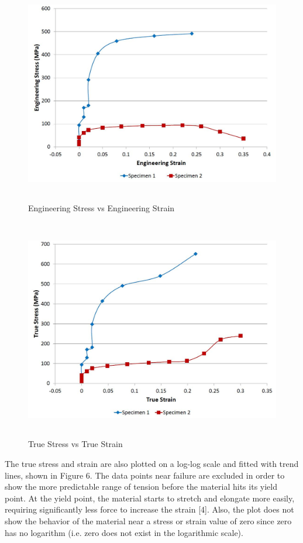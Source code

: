 \documentclass[12pt]{article}
\begin{document}
\newpage

\begin{figure}[h!]  
  \centering
    \includegraphics[width=5.5in,height=3.8in]{engr_stress_vs_engr_strain.JPG}
    \caption{Engineering Stress vs Engineering Strain}
\end{figure}

\begin{figure}[h!]  
  \centering
    \includegraphics[width=5.5in,height=3.8in]{true_stress_vs_true_strain.JPG}
    \caption{True Stress vs True Strain}
\end{figure}

\newpage

The true stress and strain are also plotted on a log-log scale and fitted with trend lines, shown in Figure 6. The data points near failure are excluded in order to show the more predictable range of tension before the material hits its yield point. At the yield point, the material starts to stretch and elongate more easily, requiring significantly less force to increase the strain [4]. Also, the plot does not show the behavior of the material near a stress or strain value of zero since zero has no logarithm (i.e. zero does not exist in the logarithmic scale). 
\bigskip
\end{document}
